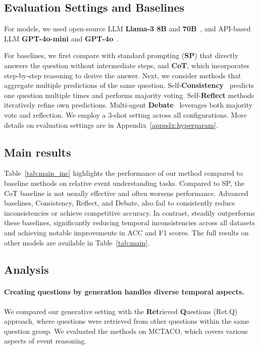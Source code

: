 \subsection{Evaluation Settings and Baselines}

For models, we used open-source LLM \textbf{Llama-3 8B} and \textbf{70B}~\cite{llama3modelcard}, and API-based LLM \textbf{GPT-4o-mini} and \textbf{GPT-4o}~\cite{openai2024gpt4technicalreport}. 

For baselines, we first compare \ours with standard prompting (\textbf{SP}) that directly answers the question without intermediate steps, and \textbf{CoT}, which incorporates step-by-step reasoning to derive the answer. Next, we consider methods that aggregate multiple predictions of the same question. Self-\textbf{Consistency}~\cite{wang2023self} predicts one question multiple times and performs majority voting. Self-\textbf{Reflect} methods~\cite{madaan2024self,shinn2024reflexion} iteratively refine own predictions. Multi-agent \textbf{Debate}~\cite{du2024improving} leverages both majority vote and reflection. We employ a 3-shot setting across all configurations. More details on evaluation settings are in Appendix~\ref{appndx:hyperparam}. 


\subsection{Main results}

Table~\ref{tab:main_inc} highlights the performance of our method compared to baseline methods on relative event understanding tasks.
Compared to SP, the CoT baseline is not usually effective and often worsens performance. 
Advanced baselines, Consistency, Reflect, and Debate, also fail to consistently reduce inconsistencies or achieve competitive accuracy.
In contrast, \ours steadily outperforms these baselines, significantly reducing temporal inconsistencies across all datasets and achieving notable improvements in ACC and F1 scores.
The full results on other models are available in Table~\ref{tab:main}. 

\subsection{Analysis}
\label{subsec:anal}
\paragraph{Creating \contrast questions by generation handles diverse temporal aspects.} We compared our generative setting with the \textbf{Ret}rieved \textbf{Q}uestions (Ret.Q) approach, where \contrast questions were retrieved from other questions within the same question group.
We evaluated the methods on MCTACO, which covers various aspects of event reasoning.

